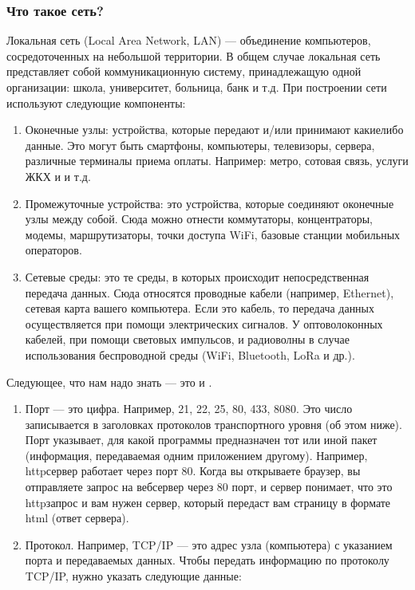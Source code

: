 \documentclass[letterpaper,10pt,russian]{sphinxmanual}
\begin{document}
\subsubsection{Что такое сеть?}
\label{\detokenize{educational_materials/docker_network/content:id3}}
\sphinxAtStartPar
Локальная сеть (Local Area Network, LAN) — объединение компьютеров, сосредоточенных на небольшой территории. В общем случае локальная сеть представляет собой коммуникационную систему, принадлежащую одной организации: школа, университет, больница, банк и т.д. При построении сети используют следующие компоненты:
\begin{enumerate}
%
\item {} 
\sphinxAtStartPar
Оконечные узлы: устройства, которые передают и/или принимают какие\sphinxhyphen{}либо данные. Это могут быть смартфоны, компьютеры, телевизоры, сервера, различные терминалы приема оплаты. Например: метро, сотовая связь, услуги ЖКХ и и т.д.

\item {} 
\sphinxAtStartPar
Промежуточные устройства: это устройства, которые соединяют оконечные узлы между собой. Сюда можно отнести коммутаторы, концентраторы, модемы, маршрутизаторы, точки доступа Wi\sphinxhyphen{}Fi, базовые станции мобильных операторов.

\item {} 
\sphinxAtStartPar
Сетевые среды: это те среды, в которых происходит непосредственная передача данных. Сюда относятся проводные кабели (например, Ethernet), сетевая карта вашего компьютера. Если это кабель, то передача данных осуществляется при помощи электрических сигналов. У оптоволоконных кабелей, при помощи световых импульсов, и радиоволны в случае использования беспроводной среды (WiFi, Bluetooth, LoRa и др.).

\end{enumerate}

\sphinxAtStartPar
Следующее, что нам надо знать — это  и .
\begin{enumerate}
%
\item {} 
\sphinxAtStartPar
Порт — это цифра. Например, 21, 22, 25, 80, 433, 8080. Это число записывается в заголовках протоколов транспортного уровня (об этом ниже). Порт указывает, для какой программы предназначен тот или иной пакет (информация, передаваемая одним приложением другому). Например, http\sphinxhyphen{}сервер работает через порт 80. Когда вы открываете браузер, вы отправляете запрос на веб\sphinxhyphen{}сервер через 80 порт, и сервер понимает, что это http\sphinxhyphen{}запрос и вам нужен сервер, который передаст вам страницу в формате html (ответ сервера).

\item {} 
\sphinxAtStartPar
Протокол. Например, TCP/IP — это адрес узла (компьютера) с указанием порта и передаваемых данных. Чтобы передать информацию по протоколу TCP/IP, нужно указать следующие данные:

\end{enumerate}
\end{document}
